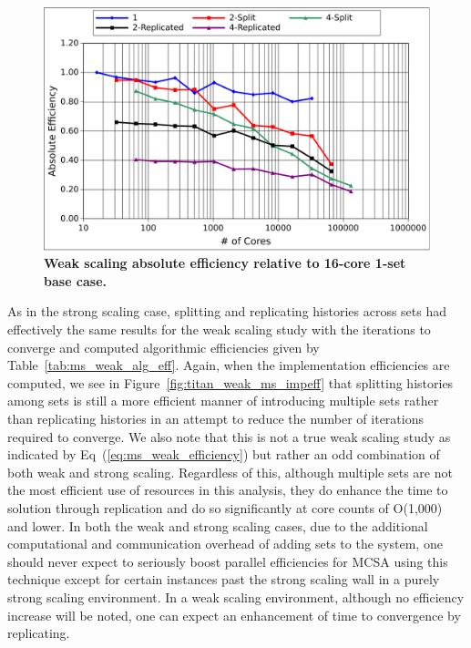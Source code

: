 \begin{figure}[t!]
  \begin{center}
    \includegraphics[width=6in]{chapters/parallel_mc/titan_weak_ms_eff.pdf}
  \end{center}
  \caption{\textbf{Weak scaling absolute efficiency relative to
      16-core 1-set base case.}}
  \label{fig:titan_weak_ms_eff}
\end{figure}

As in the strong scaling case, splitting and replicating histories
across sets had effectively the same results for the weak scaling
study with the iterations to converge and computed algorithmic
efficiencies given by Table~\ref{tab:ms_weak_alg_eff}. Again, when the
implementation efficiencies are computed, we see in
Figure~\ref{fig:titan_weak_ms_impeff} that splitting histories among
sets is still a more efficient manner of introducing multiple sets
rather than replicating histories in an attempt to reduce the number
of iterations required to converge.  We also note that this is not a
true weak scaling study as indicated by
Eq~(\ref{eq:ms_weak_efficiency}) but rather an odd combination of both
weak and strong scaling. Regardless of this, although multiple sets
are not the most efficient use of resources in this analysis, they do
enhance the time to solution through replication and do so
significantly at core counts of O(1,000) and lower. In both the weak
and strong scaling cases, due to the additional computational and
communication overhead of adding sets to the system, one should never
expect to seriously boost parallel efficiencies for MCSA using this
technique except for certain instances past the strong scaling wall in
a purely strong scaling environment. In a weak scaling environment,
although no efficiency increase will be noted, one can expect an
enhancement of time to convergence by replicating.

